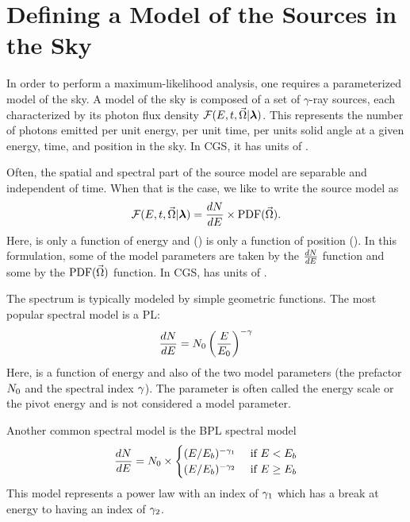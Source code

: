 \section{Defining a Model of the Sources in the Sky}

In order to perform a maximum-likelihood analysis, one requires a
parameterized model of the sky. A model of the sky is composed of a set
of $\gamma$-ray sources, each characterized by its photon flux density
$\mathcal{F}(E,t,\vec\Omega|\boldsymbol{\lambda})$.  This represents
the number of photons emitted per unit energy, per unit time, per
units solid angle at a given energy, time, and position in the sky.
In \ac{CGS}, it has units of \fluxdensityunits.

Often, the spatial and spectral part of the source model are separable
and independent of time. When that is the case, we like to write the
source model as
\begin{equation}
  \mathcal{F}(E,t,\vec\Omega|\boldsymbol{\lambda}) = \frac{dN}{dE} \times \text{PDF}(\vec\Omega).
\end{equation}
Here, \dnde is only a function of energy and \pdf(\solidangle) is only
a function of position (\solidangle).  In this formulation, some of
the model parameters \modelparams are taken by the $\frac{dN}{dE}$ function and
some by the $\text{PDF}(\vec\Omega)$ function.  In \ac{CGS}, \dnde has units
of \prefunits.

The spectrum \dnde is typically modeled by simple geometric functions.
The most popular spectral model is a \ac{PL}:
\begin{equation}
  \frac{dN}{dE} = N_0 \left(\frac{E}{E_0}\right)^{-\gamma}
\end{equation}
Here, \dnde is a function of energy and also of the two model parameters
(the prefactor $N_0$ and the spectral index $\gamma$). The
parameter \Escale is often called the energy scale or the pivot energy
and is not considered a model parameter.

Another common spectral model is the \ac{BPL} spectral model
\begin{equation}
  \frac{dN}{dE} = N_0 \times
    \begin{cases}
      (E/E_b)^{-\gamma_1} &\text{ if }E<E_b \\
      (E/E_b)^{-\gamma_2} &\text{ if }E\ge E_b
    \end{cases}
\end{equation}
This model represents a power law with an index of $\gamma_1$ which
has a break at energy \Ebreak to having an index of $\gamma_2$.

